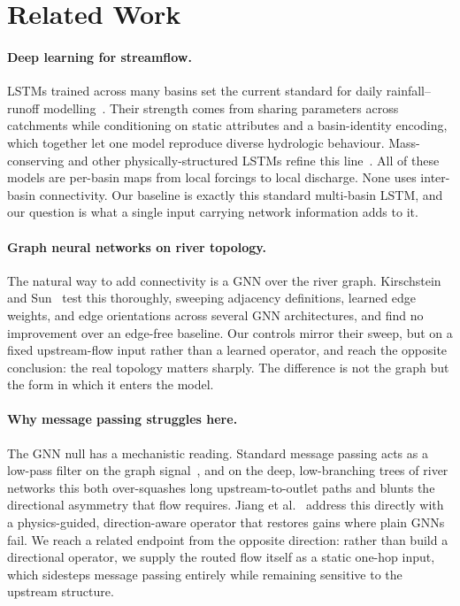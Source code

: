 \documentclass[11pt]{article}
\begin{document}
\section{Related Work}

\paragraph{Deep learning for streamflow.} LSTMs trained across many basins set the current standard
for daily rainfall--runoff modelling~\cite{kratzert2018,kratzert2019}. Their strength comes from
sharing parameters across catchments while conditioning on static attributes and a basin-identity
encoding, which together let one model reproduce diverse hydrologic behaviour. Mass-conserving and
other physically-structured LSTMs refine this line~\cite{hoedt2021}. All of these models are
per-basin maps from local forcings to local discharge. None uses inter-basin connectivity. Our
baseline is exactly this standard multi-basin LSTM, and our question is what a single input carrying
network information adds to it.

\paragraph{Graph neural networks on river topology.} The natural way to add connectivity is a GNN
over the river graph. Kirschstein and Sun~\cite{kirschstein2024} test this thoroughly, sweeping
adjacency definitions, learned edge weights, and edge orientations across several GNN architectures,
and find no improvement over an edge-free baseline. Our controls mirror their sweep, but on a fixed
upstream-flow input rather than a learned operator, and reach the opposite conclusion: the real
topology matters sharply. The difference is not the graph but the form in which it enters the model.

\paragraph{Why message passing struggles here.} The GNN null has a mechanistic reading. Standard
message passing acts as a low-pass filter on the graph
signal~\cite{topping2022,rusch2022,bodnar2022}, and on the deep, low-branching trees of river
networks this both over-squashes long upstream-to-outlet paths and blunts the directional asymmetry
that flow requires. Jiang et al.~\cite{jiang2025} address this directly with a physics-guided,
direction-aware operator that restores gains where plain GNNs fail. We reach a related endpoint from
the opposite direction: rather than build a directional operator, we supply the routed flow itself as
a static one-hop input, which sidesteps message passing entirely while remaining sensitive to the
upstream structure.
\end{document}
